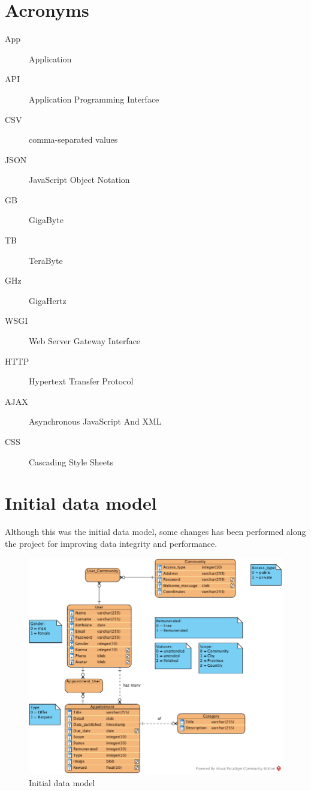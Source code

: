 \documentclass{DeustoFDP}
\begin{document}
\printbibliography[heading=bibintoc]
\chapter{Acronyms}\label{cha:acronyms}
\begin{description}
	\item[App] Application
	\item[API] Application Programming Interface
	\item[CSV] comma-separated values
	\item[JSON] JavaScript Object Notation
	\item[GB] GigaByte
	\item[TB] TeraByte
	\item[GHz] GigaHertz
	\item[WSGI] Web Server Gateway Interface
	\item[HTTP] Hypertext Transfer Protocol 
	\item[AJAX] Asynchronous JavaScript And XML
	\item[CSS] Cascading Style Sheets
\end{description}

\appendix

\chapter{Initial data model}
Although this was the initial data model, some changes has been performed along the project for improving data integrity and performance.
\begin{figure}[h]
\centering
\includegraphics[width=0.7\linewidth]{fig/Database}
\caption[Initial data model]{Initial data model}
\label{fig:Database}
\end{figure}


\backmatter
\end{document}
